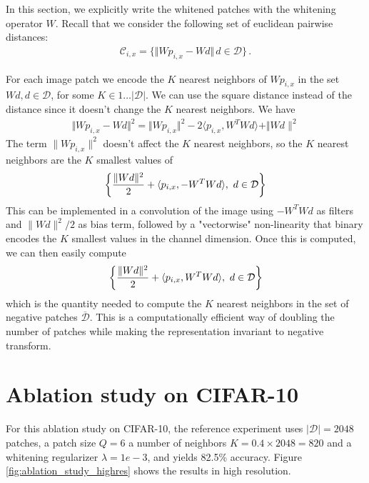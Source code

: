 \documentclass{article}
\begin{document}
In this section, we explicitly write the whitened patches with the whitening operator $W$.
Recall that  we consider the following set of euclidean pairwise distances:
\begin{align*}\mathcal{C}_{i, x} =\{\Vert W p_{i, x} - W d \Vert\, d\in\mathcal{D} \}\,.\end{align*}

For each image patch we encode the $K$ nearest neighbors of $W p_{i,x}$ in the set $Wd, d \in \mathcal{D}$, for some $ K \in 1 \ldots|\mathcal{D}| $.
We can use the square distance instead of the distance since it doesn't change the $K$ nearest neighbors.
We have 
\begin{align*}
    \Vert Wp_{i,x} - Wd \Vert^2 = \Vert Wp_{i,x} \Vert^2 - 2 \langle p_{i,x}, W^T W d \rangle + \Vert Wd\|^2
\end{align*}
The term $\|Wp_{i,x}\|^2$ doesn't affect the $K$ nearest neighbors, so the $K$ nearest neighbors are the $K$ smallest values of
\begin{align*}
        \left \lbrace {\|Wd \|^2 \over 2} + \langle p_{i,x}, -W^T W d \rangle, \ d \in \mathcal{D} \right \rbrace
\end{align*}
This can be implemented in a convolution of the image using $-W^T W d$ as filters and $\|Wd \|^2 / 2$ as bias term, followed by a "vectorwise" non-linearity that binary encodes the $K$ smallest values in the channel dimension.
Once this is computed, we can then easily compute 
\begin{align*}
        \left \lbrace {\|Wd \|^2 \over 2} + \langle p_{i,x}, W^T W d \rangle, \ d \in \mathcal{D} \right \rbrace
\end{align*}
which is the quantity needed to compute the $K$ nearest neighbors in the set of negative patches $\overline{\mathcal{D}}$.
This is a computationally efficient way of doubling the number of patches while making the representation invariant to negative transform.


\section{Ablation study on CIFAR-10}

For this ablation study on CIFAR-10, the reference experiment uses  $|\mathcal{D}|=2048$ patches, a patch size $Q=6$ a number of neighbors $K=0.4\times 2048 = 820$ and a whitening regularizer $\lambda=1e-3$, and yields 82.5\% accuracy.
Figure \ref{fig:ablation_study_highres} shows the results in high resolution.
\end{document}
